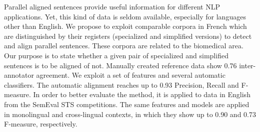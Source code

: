 Parallel aligned sentences provide useful information for different NLP applications. Yet, this kind of data is seldom available, especially for languages other than English. We propose to exploit comparable corpora in French which are distinguished by their registers (specialized and simplified versions) to detect and align parallel sentences. These corpora are related to the biomedical area. Our purpose is to state whether a given pair of specialized and simplified sentences is to be aligned of not. Manually created reference data show 0.76 inter-annotator agreement. We exploit a set of features and several automatic classifiers. The automatic alignment reaches up to 0.93 Precision, Recall and F-measure. In order to better evaluate the method, it is applied to data in English from the SemEval STS competitions. The same features and models are applied in monolingual and cross-lingual contexts, in which they show up to 0.90 and 0.73 F-measure, respectively.
